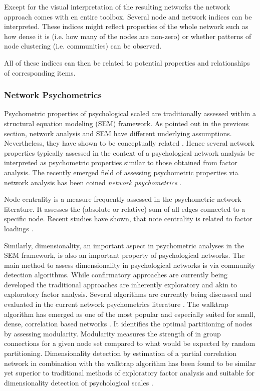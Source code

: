 Except for the visual interpretation of the resulting networks the network approach comes with en entire toolbox.
Several node and network indices can be interpreted.
These indices might reflect properties of the whole network  such as how dense it is
(i.e. how many of the nodes are non-zero) or whether patterns of node clustering (i.e. communities) can be observed.

All of these indices can then be related to potential properties and relationships of corresponding items.

\subsubsection{Network Psychometrics}
Psychometric properties of psychological scaled are traditionally assessed within a structural equation modeling (SEM) framework.
As pointed out in the previous section, network analysis and SEM have different underlying assumptions. 
Nevertheless, they have shown to be conceptually related \parencite{epskamp_network_2018}.
Hence several network properties typically assessed in the context of a psychological network analysis
be interpreted as psychometric properties similar to those obtained from factor analysis. 
The recently emerged field of assessing psychometric properties via network analysis has been coined \textit{network psychometrics} \parencite{epskamp_network_2018}.

Node centrality is a measure frequently assessed in the psychometric network literature. 
It assesses the (absolute or relative) sum of all edges connected to a specific node.
Recent studies have shown, that note centrality is related to factor loadings \parencite{mottus_why_2018}.

Similarly, dimensionality, an important aspect in psychometric analyses in the SEM framework, is also an important property of psychological networks.
The main method to assess dimensionality in psychological networks is via community detection algorithms.
While confirmatory approaches are currently being developed the traditional approaches are inherently exploratory and akin to exploratory factor analysis.
Several algorithms are currently being discussed and evaluated in the current network psychometrics literature \parencite{christensen_towards_2020}.
The walktrap algorithm has emerged as one of the most popular and especially suited for small, dense, correlation based networks \parencite{gates_monte_2016}. 
It identifies the optimal partitioning of nodes by assessing modularity. 
Modularity measures the strength of in group connections for a given node set compared to what would be expected by random partitioning.
Dimensionality detection by estimation of a partial correlation network in combination with the walktrap algorithm has been found to be 
similar yet superior to traditional methods of exploratory factor analysis and suitable for dimensionality detection of psychological scales \parencite{golino_exploratory_2017}.

